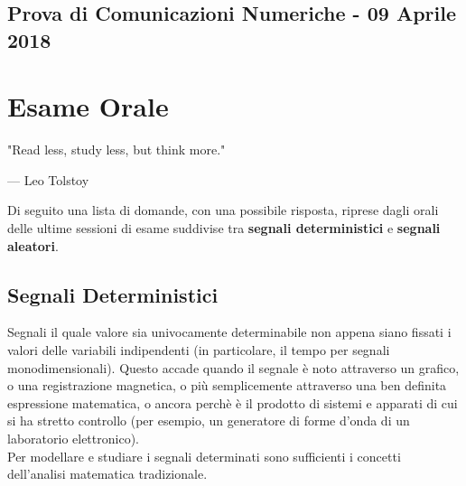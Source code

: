 \documentclass[12pt,oneside,openany]{memoir}
\numberwithin{equation}{subsection}
\begin{document}

\newpage
\section{Prova di Comunicazioni Numeriche - 09 Aprile 2018}


\chapter{Esame Orale}
\epigraph{
	"Read less, study less, but think more."
}{--- \textup{Leo Tolstoy}}

Di seguito una lista di domande, con una possibile risposta, riprese dagli orali
delle ultime sessioni di esame suddivise tra \textbf{segnali deterministici} e
\textbf{segnali aleatori}.


\section{Segnali Deterministici}
Segnali il quale valore sia univocamente determinabile non appena siano fissati
i valori delle variabili indipendenti (in particolare, il tempo per segnali
monodimensionali). Questo accade quando il segnale \`e noto attraverso un
grafico, o una registrazione magnetica, o pi\`u semplicemente attraverso una ben
definita espressione matematica, o ancora perch\`e \`e il prodotto di sistemi e
apparati di cui si ha stretto controllo (per esempio, un generatore di forme
d'onda di un laboratorio elettronico).\\
Per modellare e studiare i segnali determinati sono sufficienti i concetti
dell'analisi matematica tradizionale.

\end{document}

